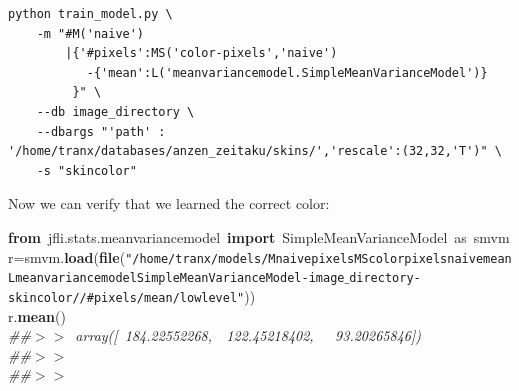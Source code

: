 \documentclass{report}
\begin{document}
\begin{lstlisting}
python train_model.py \
    -m "#M('naive')
        |{'#pixels':MS('color-pixels','naive')  
           -{'mean':L('meanvariancemodel.SimpleMeanVarianceModel')}
         }" \
    --db image_directory \
    --dbargs "'path' : '/home/tranx/databases/anzen_zeitaku/skins/','rescale':(32,32,'T')" \
    -s "skincolor" 

\end{lstlisting}






Now we can verify that we learned the correct color:





\begin{minipage}{\textwidth}
{\small
\noindent
\mbox{}\textbf{from}\ jfli.stats.meanvariancemodel\ \textbf{import}\ SimpleMeanVarianceModel\ as\ smvm \\
\mbox{}r=smvm.\textbf{load}(\textbf{file}(\texttt{"{}/home/tranx/models/MnaivepixelsMScolorpixelsnaivemeanLmeanvariancemodelSimpleMeanVarianceModel-image$\_$directory-skincolor//\#pixels/mean/lowlevel"{}})) \\
\mbox{}r.\textbf{mean}() \\
\mbox{}\textit{\#\#$>$$>$\ array([\ 184.22552268,\ \ 122.45218402,\ \ \ 93.20265846])} \\
\mbox{}\textit{\#\#$>$$>$\ } \\
\mbox{}\textit{\#\#$>$$>$\ } \\
\mbox{} \\
\mbox{}
}
\end{minipage}
\end{document}
